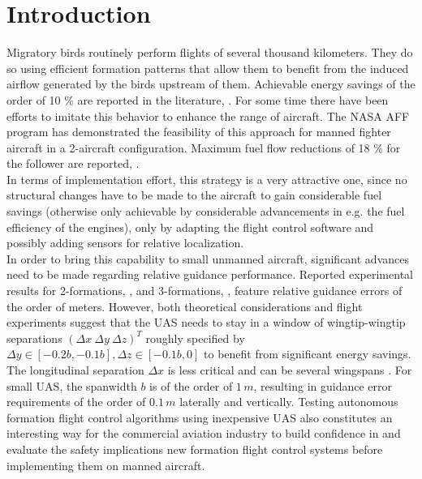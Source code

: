 \documentclass{ifacconf}
\begin{document}
\section{Introduction}
Migratory birds routinely perform flights of several thousand kilometers. They do so using efficient formation patterns that allow them to benefit from the induced airflow generated by the birds upstream of them. Achievable energy savings of the order of 10 \% are reported in the literature, \cite{Weimerskirch2001}. For some time there have been efforts to imitate this behavior to enhance the range of aircraft. The NASA AFF program has demonstrated the feasibility of this approach for manned fighter aircraft in a 2-aircraft configuration. Maximum fuel flow reductions of 18 \% for the follower are reported, \cite{jake2003f}. \\
In terms of implementation effort, this strategy is a very attractive one, since no structural changes have to be made to the aircraft to gain considerable fuel savings (otherwise only achievable by considerable advancements in e.g. the fuel efficiency of the engines), only by adapting the flight control software and possibly adding sensors for relative localization. \\
In order to bring this capability to small unmanned aircraft, significant advances need to be made regarding relative guidance performance. Reported experimental results for 2-formations, \cite{Park2004}, and 3-formations, \cite{gu2006design}, feature relative guidance errors of the order of meters. However, both theoretical considerations \cite{Hummel1982} and flight experiments \cite{jake2003f} suggest that the UAS needs to stay in a window of wingtip-wingtip separations $(\Delta x \: \Delta y \: \Delta z)^T$ roughly specified by $\Delta y \in [-0.2b, -0.1b], \Delta z \in [-0.1b, 0]$ to benefit from significant energy savings. The longitudinal separation $\Delta x$ is less critical and can be several wingspans \cite{jake2003f}. For small UAS, the spanwidth $b$ is of the order of $1 \, m$, resulting in guidance error requirements of the order of $0.1 \, m$ laterally and vertically.
%
Testing autonomous formation flight control algorithms using inexpensive UAS also constitutes an interesting way for the commercial aviation industry to build confidence in and evaluate the safety implications new formation flight control systems before implementing them on manned aircraft.\\
\end{document}
